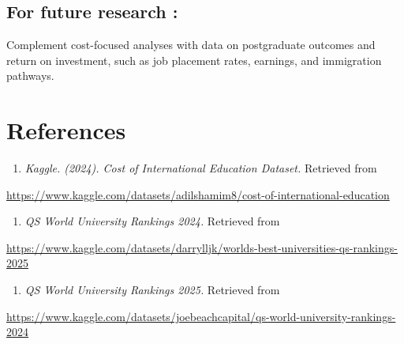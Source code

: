 \documentclass[
  letterpaper,
  DIV=11,
  numbers=noendperiod]{scrartcl}
\providecommand{\tightlist}{%
  \setlength{\itemsep}{0pt}\setlength{\parskip}{0pt}}\usepackage{longtable,booktabs,array}
\begin{document}
\subsection{For future research :}\label{for-future-research}

Complement cost-focused analyses with data on postgraduate outcomes and
return on investment, such as job placement rates, earnings, and
immigration pathways.

\section{References}\label{references}

\begin{enumerate}
\def\labelenumi{\arabic{enumi}.}
\tightlist
\item
  \emph{Kaggle. (2024). Cost of International Education Dataset.}
  Retrieved from
\end{enumerate}

\url{https://www.kaggle.com/datasets/adilshamim8/cost-of-international-education}

\begin{enumerate}
\def\labelenumi{\arabic{enumi}.}
\setcounter{enumi}{1}
\tightlist
\item
  \emph{QS World University Rankings 2024.} Retrieved from
\end{enumerate}

\url{https://www.kaggle.com/datasets/darrylljk/worlds-best-universities-qs-rankings-2025}

\begin{enumerate}
\def\labelenumi{\arabic{enumi}.}
\setcounter{enumi}{2}
\tightlist
\item
  \emph{QS World University Rankings 2025.} Retrieved from
\end{enumerate}

\url{https://www.kaggle.com/datasets/joebeachcapital/qs-world-university-rankings-2024}
\end{document}
